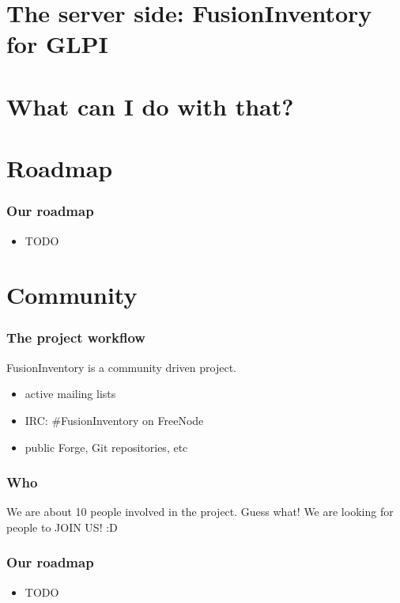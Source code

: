 \documentclass{beamer}
\begin{document}

\section{The server side: FusionInventory for GLPI}

\section{What can I do with that?}

\section{Roadmap}
%
\begin{frame}
\frametitle{Our roadmap}
%
\begin{itemize}
%
\item TODO
%
\end{itemize}
\end{frame}

\section{Community}
\begin{frame}
\frametitle{The project workflow}
FusionInventory is a community driven project.

\begin{itemize}

\item active mailing lists
\item IRC: \#FusionInventory on FreeNode
\item public Forge, Git repositories, etc

\end{itemize}
\end{frame}
\begin{frame}
\frametitle{Who}

We are about 10 people involved in the project.
\pause
Guess what!
\pause
We are looking for people to JOIN US! :D

\end{frame}
\begin{frame}

\frametitle{Our roadmap}
%
\begin{itemize}
%
\item TODO
%
\end{itemize}
\end{frame}
\end{document}
